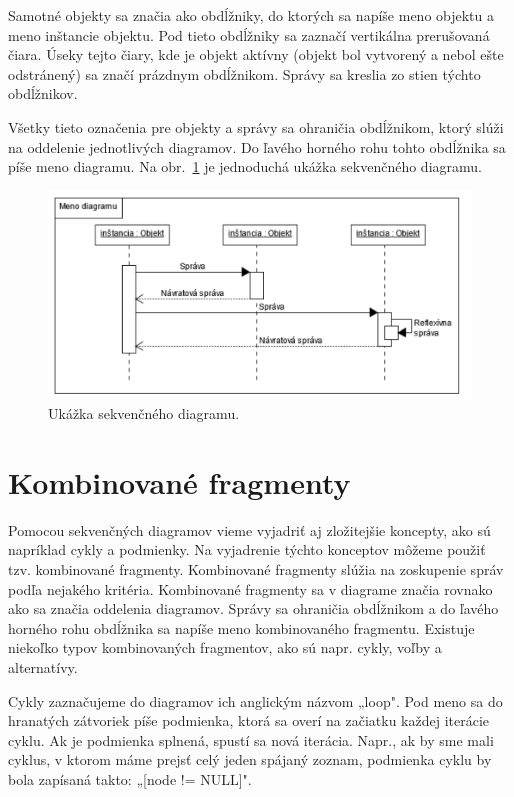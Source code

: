 \documentclass[10pt,slovak,a4paper]{article}
\begin{document}
\noindent Samotné objekty sa značia ako obdĺžniky, do ktorých sa napíše meno objektu a meno inštancie objektu. Pod tieto obdĺžniky sa zaznačí vertikálna prerušovaná čiara. 
Úseky tejto čiary, kde je objekt aktívny (objekt bol vytvorený a nebol ešte odstránený) sa značí prázdnym obdĺžnikom. Správy sa kreslia zo stien týchto obdĺžnikov. \cite{booch00} \newline

\noindent Všetky tieto označenia pre objekty a správy sa ohraničia obdĺžnikom, ktorý slúži na oddelenie jednotlivých diagramov.
Do ľavého horného rohu tohto obdĺžnika sa píše meno diagramu. \cite{booch00}
Na obr.~\ref{diag1} je jednoduchá ukážka sekvenčného diagramu.

\begin{figure}[tbh]
\centering
\includegraphics[scale=0.8]{simple_diag.pdf}
\caption{Ukážka sekvenčného diagramu.\cite{booch00}}
\label{diag1}
\end{figure}

\section{Kombinované fragmenty} \label{frag}

Pomocou sekvenčných diagramov vieme vyjadriť aj zložitejšie koncepty, ako sú napríklad cykly a podmienky. Na vyjadrenie týchto konceptov môžeme použiť tzv. kombinované fragmenty.
Kombinované fragmenty slúžia na zoskupenie správ podľa nejakého kritéria. 
Kombinované fragmenty sa v diagrame značia rovnako ako sa značia oddelenia diagramov. Správy sa ohraničia obdĺžnikom a do ľavého horného rohu obdĺžnika sa napíše meno 
kombinovaného fragmentu. Existuje niekoľko typov kombinovaných fragmentov, ako sú napr. cykly, voľby a alternatívy. \cite{booch00} \newline

\noindent Cykly zaznačujeme do diagramov ich anglickým názvom „loop". Pod meno sa do hranatých zátvoriek píše podmienka, ktorá sa overí na začiatku každej iterácie cyklu. 
Ak je podmienka splnená, spustí sa nová iterácia. 
Napr., ak by sme mali cyklus, v ktorom máme prejsť celý jeden spájaný zoznam, podmienka cyklu by bola zapísaná takto: „[node != NULL]". \cite{booch00} \newline
\end{document}
